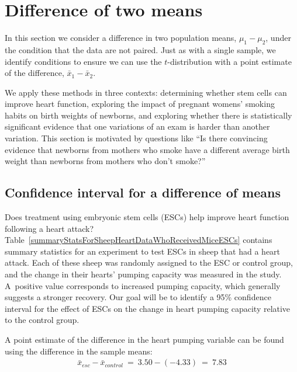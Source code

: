 \section{Difference of two means}
\label{differenceOfTwoMeans}

{
In this section we consider a difference in two population means, $\mu_1 - \mu_2$, under the condition that the data are not paired. Just as with a single sample, we identify conditions to ensure we can use the $t$-distribution with a point estimate of the difference, $\bar{x}_1 - \bar{x}_2$.

We apply these methods in three contexts: determining whether stem cells can improve heart function, exploring the impact of pregnant womens' smoking habits on birth weights of newborns, and exploring whether there is statistically significant evidence that one variations of an exam is harder than another variation. This section is motivated by questions like ``Is there convincing evidence that newborns from mothers who smoke have a different average birth weight than newborns from mothers who don't smoke?''

\subsection{Confidence interval for a difference of means}


Does treatment using embryonic stem cells (ESCs) help improve heart function following a heart attack? Table~\ref{summaryStatsForSheepHeartDataWhoReceivedMiceESCs} contains summary statistics for an experiment to test ESCs in sheep that had a heart attack. Each of these sheep was randomly assigned to the ESC or control group, and the change in their hearts' pumping capacity was measured in the study. A~positive value corresponds to increased pumping capacity, which generally suggests a stronger recovery. Our goal will be to identify a 95\% confidence interval for the effect of ESCs on the change in heart pumping capacity relative to the control group.

A point estimate of the difference in the heart pumping variable can be found using the difference in the sample means:
\begin{eqnarray*}
\bar{x}_{esc} - \bar{x}_{control}\ =\ 3.50 - (-4.33)\ =\ 7.83
\end{eqnarray*}

}
